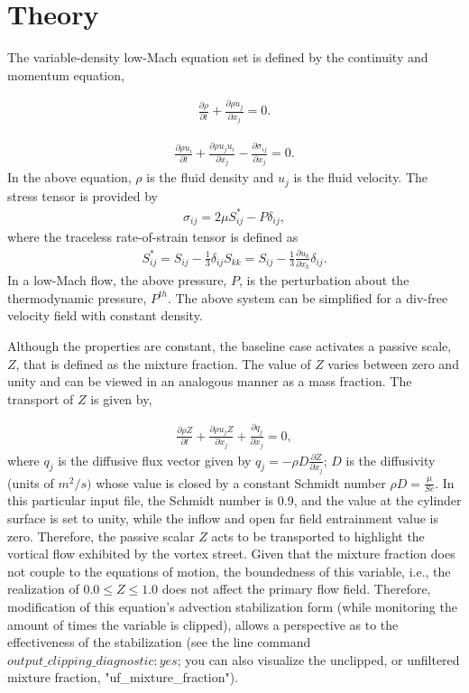 \documentclass{article}
\begin{document}
\section{Theory}
The variable-density low-Mach equation set is defined by the continuity and momentum equation,

\begin{align}
  \frac {\partial \rho }{\partial t} + \frac{ \partial \rho u_j}{\partial x_j} = 0.
\label{eq:contEq}
\end{align} 

\begin{align}
  \frac {\partial \rho u_i }{\partial t} + \frac{ \partial \rho u_j u_i}{\partial x_j} 
-\frac{\partial \sigma_{ij}}{\partial x_j} = 0.
\label{eq:momEq}
\end{align}
%
In the above equation, $\rho$ is the fluid density and $u_j$ is the fluid velocity. 
The stress tensor is provided by
\begin{align}
\sigma_{ij}  = 2 \mu S^*_{ij} - P \delta_{ij},
\end{align}
%
where the traceless rate-of-strain tensor is defined as
\begin{align}
S^*_{ij}  = S_{ij} - \frac{1}{3} \delta_{ij} S_{kk} \nonumber
		     = S_{ij} - \frac{1}{3} \frac{\partial  u_k }{\partial x_k}\delta_{ij}.
\end{align}
In a low-Mach flow, the above pressure, $P$, is the perturbation about the thermodynamic
pressure, $P^{th}$. The above system can be simplified for a div-free velocity field with constant density.

Although the properties are constant, the baseline case activates a passive scale, $Z$, that is defined as the mixture
fraction. The value of $Z$ varies between zero and unity and can be viewed in an analogous manner as a mass fraction. The transport
of $Z$ is given by,

\begin{align}
  \frac {\partial \rho Z }{\partial t} + \frac{ \partial \rho u_j Z}{\partial x_j} +\frac{\partial q_j}{\partial x_j} = 0,
\label{eq:zEq}
\end{align} 
where $q_j$ is the diffusive flux vector given by $q_j = -\rho D \frac{\partial Z}{\partial x_j}$; $D$ is the diffusivity (units
of $m^2/s)$ whose value is closed by a constant Schmidt number $\rho D = \frac{\mu}{Sc}$. In this particular input file, the
Schmidt number is 0.9, and the value at the cylinder surface is set to unity, while the inflow and open far field entrainment
value is zero. Therefore, the passive scalar $Z$ acts to be transported to highlight the vortical flow exhibited by the 
vortex street. Given that the mixture fraction does not couple to the equations of motion, the boundedness of this variable, i.e.,
the realization of $0.0 \leq Z \leq 1.0$ does not affect the primary flow field. Therefore, modification of this equation's advection
stabilization form (while monitoring the amount of times the variable is clipped),
allows a perspective as to the effectiveness of the stabilization (see the line command $output\_clipping\_diagnostic: yes$; you can also
visualize the unclipped, or unfiltered mixture fraction, "uf\_mixture\_fraction").
\end{document}
